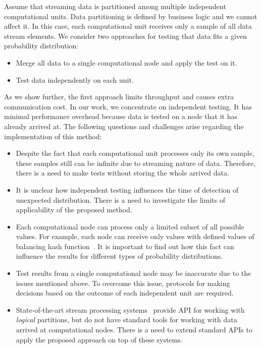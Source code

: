 \label {fs-short-model}

Assume that streaming data is partitioned among multiple independent computational units. Data partitioning is defined by business logic and we cannot affect it. In this case, each computational unit receives only a sample of all data stream elements. We consider two approaches for testing that data fits a given probability distribution:

\begin{itemize}
    \item Merge all data to a single computational node and apply the test on it.
    \item Test data independently on each unit.
\end{itemize}

As we show further, the first approach limits throughput and causes extra communication cost. In our work, we concentrate on independent testing. It has minimal performance overhead because data is tested on a node that it has already arrived at. The following questions and challenges arise regarding the implementation of this method:

\begin{itemize}
    \item Despite the fact that each computational unit processes only its own sample, these samples still can be infinite due to streaming nature of data. Therefore, there is a need to make tests without storing the whole arrived data.
    \item It is unclear how independent testing influences the time of detection of unexpected distribution. There is a need to investigate the limits of applicability of the proposed method.
    \item Each computational node can process only a limited subset of all possible values. For example, each node can receive only values with defined values of balancing hash function~\cite{carbone2015apache}. It is important to find out how this fact can influence the results for different types of probability distributions.
    \item Test results from a single computational node may be inaccurate due to the issues mentioned above. To overcome this issue, protocols for making decisions based on the outcome of each independent unit are required.
    \item State-of-the-art stream processing systems~\cite{Carbone:2017:SMA:3137765.3137777, apache:storm, Zaharia:2012:DSE:2342763.2342773} provide API for working with {\em logical} partitions, but do not have standard tools for working with data arrived at computational nodes. There is a need to extend standard APIs to apply the proposed approach on top of these systems.
\end{itemize}